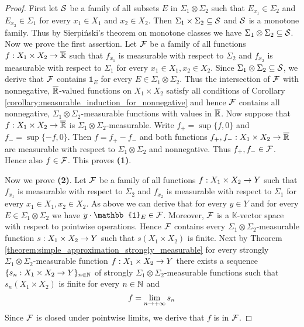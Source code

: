 \begin{proof}
    First let ${\mathcal S}$ be a family of all subsets $E$ in $\Sigma_1\otimes \Sigma_2$ such that $E_{x_1}\in \Sigma_2$ and $E_{x_2}\in \Sigma_1$ for every $x_1\in X_1$ and $x_2\in X_2$. Then $\Sigma_1\times \Sigma_2\subseteq {\mathcal S}$ and ${\mathcal S}$ is a monotone family. Thus by Sierpiński's theorem on monotone classes we have $\Sigma_1\otimes \Sigma_2\subseteq {\mathcal S}$.\\
    Now we prove the first assertion. Let ${\mathcal F}$ be a family of all functions $f:X_1\times X_2\rightarrow \overline{{\mathbb R}}$ such that $f_{x_1}$ is measurable with respect to $\Sigma_2$ and $f_{x_2}$ is measurable with respect to $\Sigma_1$ for every $x_1\in X_1,x_2\in X_2$. Since $\Sigma_1\otimes \Sigma_2\subseteq {\mathcal S}$, we derive that ${\mathcal F}$ contains $\mathbb{1}_E$ for every $E\in \Sigma_1\otimes \Sigma_2$. Thus the intersection of ${\mathcal F}$ with nonnegative, $\overline{{\mathbb R}}$-valued functions on $X_1\times X_2$ satisfy all conditions of Corollary \ref{corollary:measurable_induction_for_nonnegative} and hence ${\mathcal F}$ contains all nonnegative, $\Sigma_1\otimes \Sigma_2$-measurable functions with values in $\overline{{\mathbb R}}$. Now suppose that $f:X_1\times X_2\rightarrow \overline{{\mathbb R}}$ is $\Sigma_1\otimes \Sigma_2$-measurable. Write $f_+ = \sup\{f, 0\}$ and $f_- = \sup\{-f, 0\}$. Then $f = f_+ - f_-$ and both functions $f_+,f_-:X_1\times X_2\rightarrow \overline{{\mathbb R}}$ are measurable with respect to $\Sigma_1\otimes \Sigma_2$ and nonnegative. Thus $f_+,f_-\in {\mathcal F}$. Hence also $f\in {\mathcal F}$. This proves \textbf{(1)}.

    Now we prove \textbf{(2)}. Let ${\mathcal F}$ be a family of all functions $f:X_1\times X_2\rightarrow Y$ such that $f_{x_1}$ is measurable with respect to $\Sigma_2$ and $f_{x_2}$ is measurable with respect to $\Sigma_1$ for every $x_1\in X_1,x_2\in X_2$. As above we can derive that for every $y\in Y$ and for every $E\in \Sigma_1\otimes \Sigma_2$ we have $y\cdot \mathbb{1}_E\in \cF$. Moreover, ${\mathcal F}$ is a $\mathbb{K}$-vector space with respect to pointwise operations. Hence ${\mathcal F}$ contains every $\Sigma_1\otimes \Sigma_2$-measurable function $s:X_1\times X_2\rightarrow Y$ such that $s(X_1\times X_2)$ is finite. Next by Theorem \ref{theorem:simple_approximation_strongly_measurable} for every strongly $\Sigma_1\otimes \Sigma_2$-measurable function $f:X_1\times X_2\rightarrow Y$ there exists a sequence $\{s_n:X_1\times X_2\rightarrow Y\}_{n\in {\mathbb N}}$ of strongly $\Sigma_1\otimes \Sigma_2$-measurable functions such that $s_n(X_1\times X_2)$ is finite for every $n\in {\mathbb N}$ and
    $$f = \lim_{n\rightarrow +\infty}s_n$$
    Since ${\mathcal F}$ is closed under pointwise limits, we derive that $f$ is in ${\mathcal F}$.
\end{proof}

